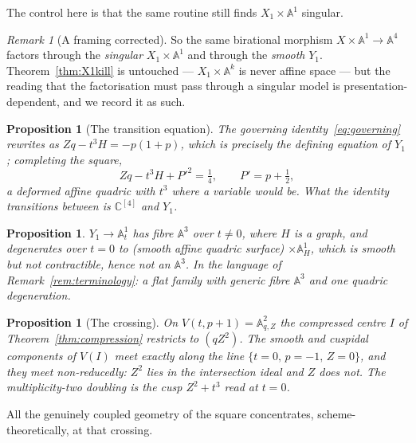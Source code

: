 \documentclass[11pt]{article}
\newtheorem{proposition}[theorem]{Proposition}
\theoremstyle{definition}
\theoremstyle{remark}
\newtheorem{remark}[theorem]{Remark}
\newcommand{\C}{\mathbb{C}}
\newcommand{\Aff}[1]{\mathbb{A}^{#1}}
\begin{document}
The control here is that the same routine still finds $X_1\times\Aff{1}$
singular.

\begin{remark}[A framing corrected]\label{rem:framing}
So the same birational morphism $X\times\Aff{1}\to\Aff{4}$ factors through the
\emph{singular} $X_1\times\Aff{1}$ and through the \emph{smooth} $Y_1$.
Theorem~\ref{thm:X1kill} is untouched --- $X_1\times\Aff{k}$ is never affine
space --- but the reading that the factorisation must pass through a singular
model is presentation-dependent, and we record it as such.
\end{remark}

\begin{proposition}[The transition equation]\label{prop:transition}
The governing identity~\eqref{eq:governing} rewrites as $Zq-t^3H=-p(1+p)$,
which is precisely the defining equation of $Y_1$; completing the square,
\[
Zq-t^3H+P'^2=\tfrac14,\qquad P'=p+\tfrac12,
\]
a deformed affine quadric with $t^3$ where a variable would be. What the
identity transitions between is $\C^{[4]}$ and $Y_1$.
\end{proposition}

\begin{proposition}\label{prop:Y1fibration}
$Y_1\to\Aff{1}_t$ has fibre $\Aff{3}$ over $t\ne0$, where $H$ is a graph, and
degenerates over $t=0$ to (smooth affine quadric surface) $\times\Aff{1}_H$,
which is smooth but not contractible, hence not an $\Aff{3}$. In the language
of Remark~\ref{rem:terminology}: a flat family with generic fibre $\Aff{3}$
and one quadric degeneration.
\end{proposition}

\begin{proposition}[The crossing]\label{prop:crossing}
On $V(t,p+1)=\Aff{2}_{q,Z}$ the compressed centre $I$ of
Theorem~\ref{thm:compression} restricts to $(qZ^2)$. The smooth and cuspidal
components of $V(I)$ meet exactly along the line $\{t=0,\,p=-1,\,Z=0\}$, and
they meet \emph{non-reducedly}: $Z^2$ lies in the intersection ideal and $Z$
does not. The multiplicity-two doubling is the cusp $Z^2+t^3$ read at $t=0$.
\end{proposition}

All the genuinely coupled geometry of the square concentrates,
scheme-theoretically, at that crossing.
\end{document}
